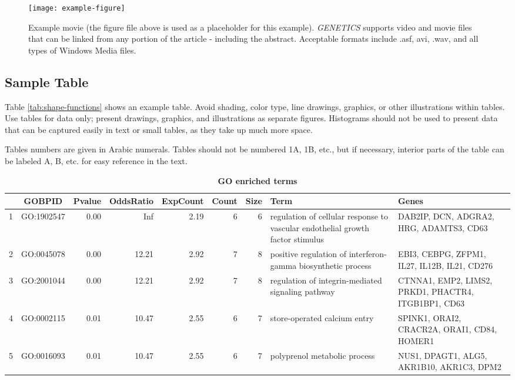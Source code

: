 \documentclass[9pt,twocolumn,twoside]{gsajnl}
\begin{document}
\begin{figure}[htbp]
\centering
\texttt{[image: example-figure]}
\caption{Example movie (the figure file above is used as a placeholder for this example). \textit{GENETICS} supports video and movie files that can be linked from any portion of the article - including the abstract. Acceptable formats include .asf, avi, .wav, and all types of Windows Media files.   
}%
\label{video:spectrum}
\end{figure}


\subsection*{Sample Table}

Table \ref{tab:shape-functions} shows an example table. Avoid shading, color type, line drawings, graphics, or other illustrations within tables. Use tables for data only; present drawings, graphics, and illustrations as separate figures. Histograms should not be used to present data that can be captured easily in text or small tables, as they take up much more space.  

Tables numbers are given in Arabic numerals. Tables should not be numbered 1A, 1B, etc., but if necessary, interior parts of the table can be labeled A, B, etc. for easy reference in the text.  

\begin{table*}[htbp]
\centering
\caption{\bf GO enriched terms}
\begin{tableminipage}{\textwidth}
 \begin{tabular}{l|c|r|r|r|r|r|p{3cm}|p{3cm}|}
   \hline
  & GOBPID & Pvalue & OddsRatio & ExpCount & Count & Size & Term & Genes \\ 
   \hline
 1 & GO:1902547 & 0.00 & Inf & 2.19 &   6 &   6 & regulation of cellular response to vascular endothelial growth factor stimulus & DAB2IP, DCN, ADGRA2, HRG, ADAMTS3, CD63 \\ 
   2 & GO:0045078 & 0.00 & 12.21 & 2.92 &   7 &   8 & positive regulation of interferon-gamma biosynthetic process & EBI3, CEBPG, ZFPM1, IL27, IL12B, IL21, CD276 \\ 
   3 & GO:2001044 & 0.00 & 12.21 & 2.92 &   7 &   8 & regulation of integrin-mediated signaling pathway & CTNNA1, EMP2, LIMS2, PRKD1, PHACTR4, ITGB1BP1, CD63 \\ 
   4 & GO:0002115 & 0.01 & 10.47 & 2.55 &   6 &   7 & store-operated calcium entry & SPINK1, ORAI2, CRACR2A, ORAI1, CD84, HOMER1 \\ 
   5 & GO:0016093 & 0.01 & 10.47 & 2.55 &   6 &   7 & polyprenol metabolic process & NUS1, DPAGT1, ALG5, AKR1B10, AKR1C3, DPM2 \\ 
    \hline
 \end{tabular}
 \label{tab:GOenrichment}
\end{tableminipage}
\end{table*}
\end{document}
